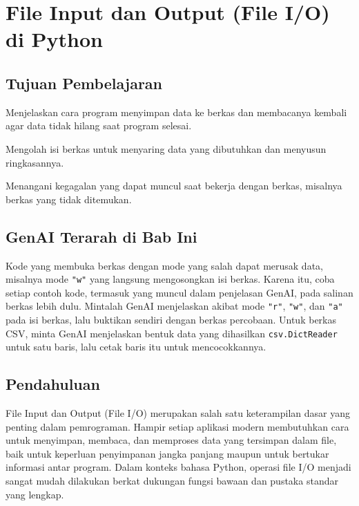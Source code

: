 \chapter{File Input dan Output (File I/O) di Python}

\section*{Tujuan Pembelajaran}
\begin{daftarrapat}
  \item Menjelaskan cara program menyimpan data ke berkas dan membacanya kembali agar data tidak hilang saat program selesai.
  \item Mengolah isi berkas untuk menyaring data yang dibutuhkan dan menyusun ringkasannya.
  \item Menangani kegagalan yang dapat muncul saat bekerja dengan berkas, misalnya berkas yang tidak ditemukan.
\end{daftarrapat}

\section*{GenAI Terarah di Bab Ini}

Kode yang membuka berkas dengan mode yang salah dapat merusak data, misalnya mode \texttt{"w"} yang langsung mengosongkan isi berkas. Karena itu, coba setiap contoh kode, termasuk yang muncul dalam penjelasan GenAI, pada salinan berkas lebih dulu. Mintalah GenAI menjelaskan akibat mode \texttt{"r"}, \texttt{"w"}, dan \texttt{"a"} pada isi berkas, lalu buktikan sendiri dengan berkas percobaan. Untuk berkas CSV, minta GenAI menjelaskan bentuk data yang dihasilkan \texttt{csv.DictReader} untuk satu baris, lalu cetak baris itu untuk mencocokkannya.

\section{Pendahuluan}

File Input dan Output (File I/O) merupakan salah satu keterampilan dasar yang penting dalam pemrograman. Hampir setiap aplikasi modern membutuhkan cara untuk menyimpan, membaca, dan memproses data yang tersimpan dalam file, baik untuk keperluan penyimpanan jangka panjang maupun untuk bertukar informasi antar program. Dalam konteks bahasa Python, operasi file I/O menjadi sangat mudah dilakukan berkat dukungan fungsi bawaan dan pustaka standar yang lengkap.

